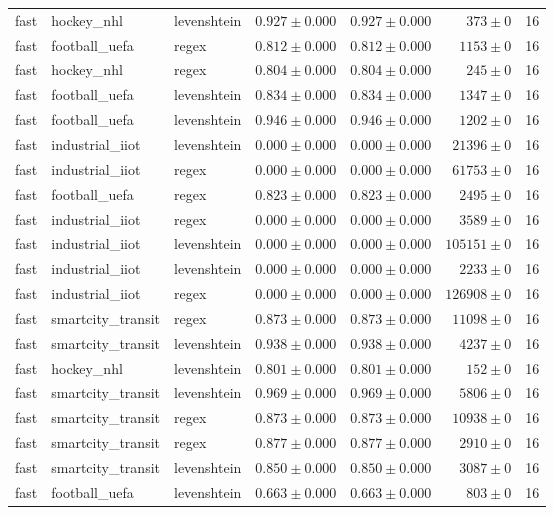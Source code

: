 \begin{table}[htbp]
\begin{tabular}{l l l r r r r}
fast & hockey\_nhl & levenshtein & $0.927\pm0.000$ & $0.927\pm0.000$ & $373\pm0$ & 16 \\
fast & football\_uefa & regex & $0.812\pm0.000$ & $0.812\pm0.000$ & $1153\pm0$ & 16 \\
fast & hockey\_nhl & regex & $0.804\pm0.000$ & $0.804\pm0.000$ & $245\pm0$ & 16 \\
fast & football\_uefa & levenshtein & $0.834\pm0.000$ & $0.834\pm0.000$ & $1347\pm0$ & 16 \\
fast & football\_uefa & levenshtein & $0.946\pm0.000$ & $0.946\pm0.000$ & $1202\pm0$ & 16 \\
fast & industrial\_iiot & levenshtein & $0.000\pm0.000$ & $0.000\pm0.000$ & $21396\pm0$ & 16 \\
fast & industrial\_iiot & regex & $0.000\pm0.000$ & $0.000\pm0.000$ & $61753\pm0$ & 16 \\
fast & football\_uefa & regex & $0.823\pm0.000$ & $0.823\pm0.000$ & $2495\pm0$ & 16 \\
fast & industrial\_iiot & regex & $0.000\pm0.000$ & $0.000\pm0.000$ & $3589\pm0$ & 16 \\
fast & industrial\_iiot & levenshtein & $0.000\pm0.000$ & $0.000\pm0.000$ & $105151\pm0$ & 16 \\
fast & industrial\_iiot & levenshtein & $0.000\pm0.000$ & $0.000\pm0.000$ & $2233\pm0$ & 16 \\
fast & industrial\_iiot & regex & $0.000\pm0.000$ & $0.000\pm0.000$ & $126908\pm0$ & 16 \\
fast & smartcity\_transit & regex & $0.873\pm0.000$ & $0.873\pm0.000$ & $11098\pm0$ & 16 \\
fast & smartcity\_transit & levenshtein & $0.938\pm0.000$ & $0.938\pm0.000$ & $4237\pm0$ & 16 \\
fast & hockey\_nhl & levenshtein & $0.801\pm0.000$ & $0.801\pm0.000$ & $152\pm0$ & 16 \\
fast & smartcity\_transit & levenshtein & $0.969\pm0.000$ & $0.969\pm0.000$ & $5806\pm0$ & 16 \\
fast & smartcity\_transit & regex & $0.873\pm0.000$ & $0.873\pm0.000$ & $10938\pm0$ & 16 \\
fast & smartcity\_transit & regex & $0.877\pm0.000$ & $0.877\pm0.000$ & $2910\pm0$ & 16 \\
fast & smartcity\_transit & levenshtein & $0.850\pm0.000$ & $0.850\pm0.000$ & $3087\pm0$ & 16 \\
fast & football\_uefa & levenshtein & $0.663\pm0.000$ & $0.663\pm0.000$ & $803\pm0$ & 16 \\

\end{tabular}
\end{table}
